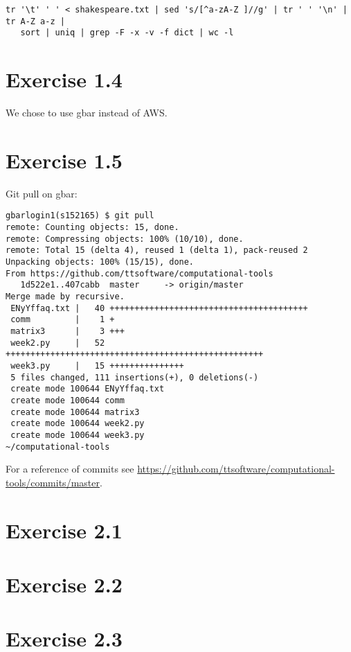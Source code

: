 \documentclass{article}
\begin{document}
\begin{verbatim}
tr '\t' ' ' < shakespeare.txt | sed 's/[^a-zA-Z ]//g' | tr ' ' '\n' | tr A-Z a-z | 
   sort | uniq | grep -F -x -v -f dict | wc -l
\end{verbatim}


\section{Exercise 1.4}

We chose to use gbar instead of AWS.

\section{Exercise 1.5}

Git pull on gbar: 

\begin{lstlisting}
gbarlogin1(s152165) $ git pull
remote: Counting objects: 15, done.
remote: Compressing objects: 100% (10/10), done.
remote: Total 15 (delta 4), reused 1 (delta 1), pack-reused 2
Unpacking objects: 100% (15/15), done.
From https://github.com/ttsoftware/computational-tools
   1d522e1..407cabb  master     -> origin/master
Merge made by recursive.
 ENyYffaq.txt |   40 ++++++++++++++++++++++++++++++++++++++++
 comm         |    1 +
 matrix3      |    3 +++
 week2.py     |   52 ++++++++++++++++++++++++++++++++++++++++++++++++++++
 week3.py     |   15 +++++++++++++++
 5 files changed, 111 insertions(+), 0 deletions(-)
 create mode 100644 ENyYffaq.txt
 create mode 100644 comm
 create mode 100644 matrix3
 create mode 100644 week2.py
 create mode 100644 week3.py
~/computational-tools
\end{lstlisting}

For a reference of commits see \href{https://github.com/ttsoftware/computational-tools/commits/master}{https://github.com/ttsoftware/computational-tools/commits/master}.

\section{Exercise 2.1}
\section{Exercise 2.2}
\section{Exercise 2.3}
\end{document}

